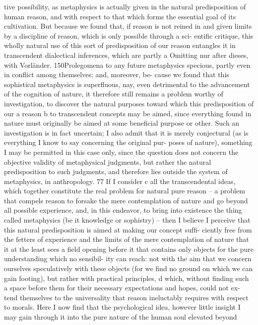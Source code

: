 tive possibility, as metaphysics is actually given in the natural predisposition
of human reason, and with respect to that which forms the essential goal
of its cultivation. But because we found that, if reason is not reined in and
given limits by a discipline of reason, which is only possible through a sci-
entiﬁc critique, this wholly natural use of this sort of predisposition of our
reason entangles it in transcendent dialectical inferences, which are partly
a
Omitting nur after dieses, with Vorländer.
150Prolegomena to any future metaphysics
specious, partly even in conﬂict among themselves; and, moreover, be-
cause we found that this sophistical metaphysics is superﬂuous, nay, even
detrimental to the advancement of the cognition of nature, it therefore
still remains a problem worthy of investigation, to discover the natural
purposes toward which this predisposition of our a reason b to transcendent
concepts may be aimed, since everything found in nature must originally
be aimed at some beneﬁcial purpose or other.
Such an investigation is in fact uncertain; I also admit that it is merely
conjectural (as is everything I know to say concerning the original pur-
poses of nature), something I may be permitted in this case only, since
the question does not concern the objective validity of metaphysical
judgments, but rather the natural predisposition to such judgments, and
therefore lies outside the system of metaphysics, in anthropology. 77
If I consider c all the transcendental ideas, which together constitute
the real problem for natural pure reason – a problem that compels reason
to forsake the mere contemplation of nature and go beyond all possible
experience, and, in this endeavor, to bring into existence the thing called
metaphysics (be it knowledge or sophistry) – then I believe I perceive
that this natural predisposition is aimed at making our concept sufﬁ-
ciently free from the fetters of experience and the limits of the mere
contemplation of nature that it at the least sees a ﬁeld opening before it
that contains only objects for the pure understanding which no sensibil-
ity can reach: not with the aim that we concern ourselves speculatively
with these objects (for we ﬁnd no ground on which we can gain footing),
but rather with practical principles, d which, without ﬁnding such a space
before them for their necessary expectations and hopes, could not ex-
tend themselves to the universality that reason ineluctably requires with
respect to morals.
Here I now ﬁnd that the psychological idea, however little insight I may
gain through it into the pure nature of the human soul elevated beyond
